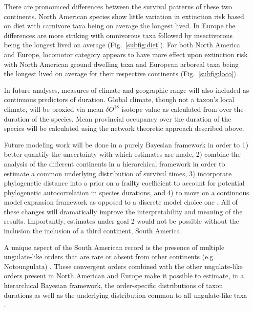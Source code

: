 \documentclass[11pt,letterpaper]{article}
\begin{document}
There are pronounced differences between the survival patterns of these two continents. North American species show little variation in extinction risk based on diet with carnivore taxa being on average the longest lived. In Europe the differences are more striking with omnivorous taxa followed by insectivorous being the longest lived on average (Fig.~\ref{subfig:diet}). For both North America and Europe, locomotor category appears to have more effect upon extinction risk with North American ground dwelling taxa and European arboreal taxa being the longest lived on average for their respective continents (Fig.~\ref{subfig:loco}).

In future analyses, measures of climate and geographic range will also included as continuous predictors of duration. Global climate, though not a taxon's local climate, will be proxied via mean \(\delta O^{18}\) isotope value as calculated from \citet{Zachos2008} over the duration of the species. Mean provincial occupancy over the duration of the species will be calculated using the network theoretic approach described above.

Future modeling work will be done in a purely Bayesian framework in order to 1) better quantify the uncertainty with which estimates are made, 2) combine the analysis of the different continents in a hierarchical framework in order to estimate a common underlying distribution of survival times, 3) incorporate phylogenetic distance into a prior on a frailty coefficient \citep{Banerjee2003a,Ibrahim2001} to account for potential phylogenetic autocorrelation in species durations, and 4) to move on a continuous model expansion framework as opposed to a discrete model choice one \citep{Gelman2013d}. All of these changes will dramatically improve the interpretability and meaning of the results. Importantly, estimates under goal 2 would not be possible without the inclusion the inclusion of a third continent, South America. 

A unique aspect of the South American record is the presence of multiple ungulate-like orders that are rare or absent from other continents (e.g. Notoungulata) \citep{Marshall1982,Macfadden1997,Macfadden2006,Flynn1998a}. These convergent orders combined with the other ungulate-like orders present in North American and Europe make it possible to estimate, in a hierarchical Bayesian framework, the order-specific distributions of taxon durations as well as the underlying distribution common to all ungulate-like taxa \citep{Gelman2013d}.
\end{document}
